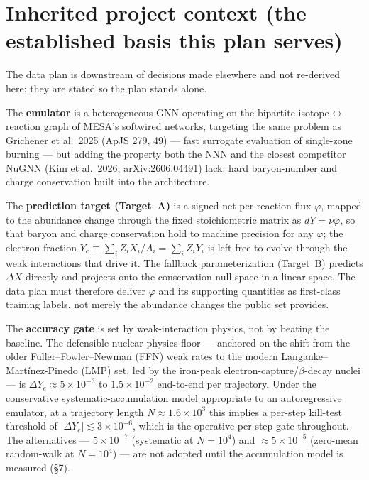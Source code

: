 \documentclass[11pt]{article}
\newcommand{\Ye}{\ensuremath{Y_e}}
\begin{document}
\begin{abstract}
derivation above is CPU-cheap and embarrassingly parallel. Year-1 therefore lives on the public data, derives all kill-test quantities immediately, negotiates the 4\,TB superset early, and defers fresh burns to \texttt{mesa\_204} and new regimes. The single number that reshapes everything downstream --- the per-step \Ye{} accuracy gate --- is fixed by the error-accumulation slope of the trained emulator, a quantity no external paper settles and that only a local rollout experiment can measure.
\end{abstract}

{\small\tableofcontents}
\bigskip

\section{Inherited project context (the established basis this plan serves)}

The data plan is downstream of decisions made elsewhere and not re-derived here; they are stated so the plan stands alone.

The \textbf{emulator} is a heterogeneous GNN operating on the bipartite isotope$\leftrightarrow$reaction graph of MESA's softwired networks, targeting the same problem as Grichener et al.\ 2025 (ApJS 279, 49) --- fast surrogate evaluation of single-zone burning --- but adding the property both the NNN and the closest competitor NuGNN (Kim et al.\ 2026, arXiv:2606.04491) lack: hard baryon-number and charge conservation built into the architecture.

The \textbf{prediction target (Target~A)} is a signed net per-reaction flux $\varphi$, mapped to the abundance change through the fixed stoichiometric matrix as $dY = \nu\varphi$, so that baryon and charge conservation hold to machine precision for any $\varphi$; the electron fraction $Y_e \equiv \sum_i Z_i X_i / A_i = \sum_i Z_i Y_i$ is left free to evolve through the weak interactions that drive it. The fallback parameterization (Target~B) predicts $\Delta X$ directly and projects onto the conservation null-space in a linear space. The data plan must therefore deliver $\varphi$ and its supporting quantities as first-class training labels, not merely the abundance changes the public set provides.

The \textbf{accuracy gate} is set by weak-interaction physics, not by beating the baseline. The defensible nuclear-physics floor --- anchored on the shift from the older Fuller--Fowler--Newman (FFN) weak rates to the modern Langanke--Mart\'inez-Pinedo (LMP) set, led by the iron-peak electron-capture/$\beta$-decay nuclei --- is $\Delta Y_e \approx 5\times 10^{-3}$ to $1.5\times 10^{-2}$ end-to-end per trajectory. Under the conservative systematic-accumulation model appropriate to an autoregressive emulator, at a trajectory length $N \approx 1.6\times 10^3$ this implies a per-step kill-test threshold of $|\Delta Y_e| \lesssim 3\times 10^{-6}$, which is the operative per-step gate throughout. The alternatives --- $5\times 10^{-7}$ (systematic at $N = 10^4$) and $\approx 5\times 10^{-5}$ (zero-mean random-walk at $N = 10^4$) --- are not adopted until the accumulation model is measured (\S7).
\end{document}
